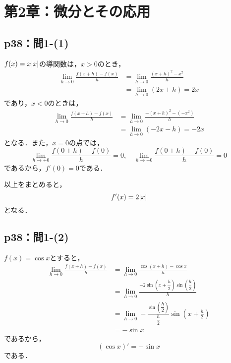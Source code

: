 \documentclass[uplatex,dvipdfmx,a4paper,10pt,fleqn]{jsarticle}
\newenvironment{tleftbar}{\begin{tbleftline}\setlength{\parindent}{1zw}}{\end{tbleftline}}
\begin{document}
\section*{第2章：微分とその応用}

\subsection*{p38：問1-(1)}

\begin{tleftbar}
    $f(x)=x \abs{x}$の導関数は，$x>0$のとき，
    \begin{align*} 
        \lim_{h \to 0} \frac{f(x+h)-f(x)}{h} & =\lim_{h \to 0} \frac{(x+h)^2-x^2}{h} \\
        & = \lim_{h \to 0} (2x+h) =2x 
    \end{align*} 
    であり，$x<0$のときは，
    \begin{align*} 
        \lim_{h \to 0} \frac{f(x+h)-f(x)}{h} & = \lim_{h \to 0} \frac{-(x+h)^2-(-x^2)}{h} \\
        & = \lim_{h \to 0} (-2x-h) =-2x 
    \end{align*} 
    となる．また，$x=0$の点では，
    \[
        \lim_{h \to +0} \frac{f(0+h)-f(0)}{h} =0, \quad  \lim_{h \to -0} \frac{f(0+h)-f(0)}{h} =0
    \]
    であるから，$f'(0)=0$である．

    以上をまとめると，
    \[
        f'(x)=2\abs{x}
    \]
    となる．
\end{tleftbar}

\newpage 


\subsection*{p38：問1-(2)}

\begin{tleftbar}
    $f(x)= \cos x$とすると，
    \begin{align*} 
        \lim_{h \to 0} \frac{f(x+h)-f(x)}{h} & =  \lim_{h \to 0}\frac{\cos (x+h)-\cos x}{h} \\
        & =  \lim_{h \to 0} \frac{ -2 \sin \left  (x+\dfrac{h}{2} \right ) \sin \left (\dfrac{h}{2} \right )}{h} \\
        & =  \lim_{h \to 0}- \frac{\sin \left (\dfrac{h}{2} \right )}{\dfrac{h}{2}} \sin \left (x+\frac{h}{2} \right) \\
        & = -\sin x 
    \end{align*}
        であるから，
        \[
            (\cos x)' = -\sin x
        \]
        である．
\end{tleftbar}
\end{document}
